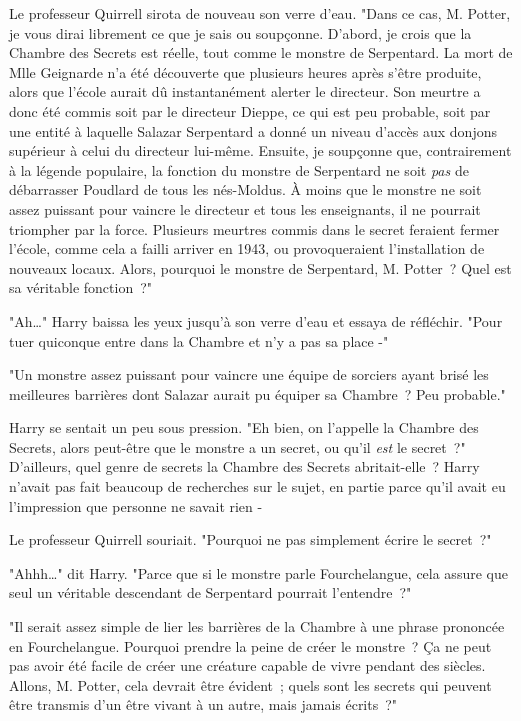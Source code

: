 Le professeur Quirrell sirota de nouveau son verre d'eau. "Dans ce cas, M. Potter, je vous dirai librement ce que je sais ou soupçonne. D'abord, je crois que la Chambre des Secrets est réelle, tout comme le monstre de Serpentard. La mort de Mlle Geignarde n'a été découverte que plusieurs heures après s'être produite, alors que l'école aurait dû instantanément alerter le directeur. Son meurtre a donc été commis soit par le directeur Dieppe, ce qui est peu probable, soit par une entité à laquelle Salazar Serpentard a donné un niveau d'accès aux donjons supérieur à celui du directeur lui-même. Ensuite, je soupçonne que, contrairement à la légende populaire, la fonction du monstre de Serpentard ne soit \emph{pas} de débarrasser Poudlard de tous les nés-Moldus. À moins que le monstre ne soit assez puissant pour vaincre le directeur et tous les enseignants, il ne pourrait triompher par la force. Plusieurs meurtres commis dans le secret feraient fermer l'école, comme cela a failli arriver en 1943, ou provoqueraient l'installation de nouveaux locaux. Alors, pourquoi le monstre de Serpentard, M. Potter~? Quel est sa véritable fonction~?"

"Ah…" Harry baissa les yeux jusqu'à son verre d'eau et essaya de réfléchir. "Pour tuer quiconque entre dans la Chambre et n'y a pas sa place -"

"Un monstre assez puissant pour vaincre une équipe de sorciers ayant brisé les meilleures barrières dont Salazar aurait pu équiper sa Chambre~? Peu probable."

Harry se sentait un peu sous pression. "Eh bien, on l'appelle la Chambre des Secrets, alors peut-être que le monstre a un secret, ou qu'il \emph{est} le secret~?" D'ailleurs, quel genre de secrets la Chambre des Secrets abritait-elle~? Harry n'avait pas fait beaucoup de recherches sur le sujet, en partie parce qu'il avait eu l'impression que personne ne savait rien -

Le professeur Quirrell souriait. "Pourquoi ne pas simplement écrire le secret~?"

"Ahhh…" dit Harry. "Parce que si le monstre parle Fourchelangue, cela assure que seul un véritable descendant de Serpentard pourrait l'entendre~?"

"Il serait assez simple de lier les barrières de la Chambre à une phrase prononcée en Fourchelangue. Pourquoi prendre la peine de créer le monstre~? Ça ne peut pas avoir été facile de créer une créature capable de vivre pendant des siècles. Allons, M. Potter, cela devrait être évident~; quels sont les secrets qui peuvent être transmis d'un être vivant à un autre, mais jamais écrits~?"

